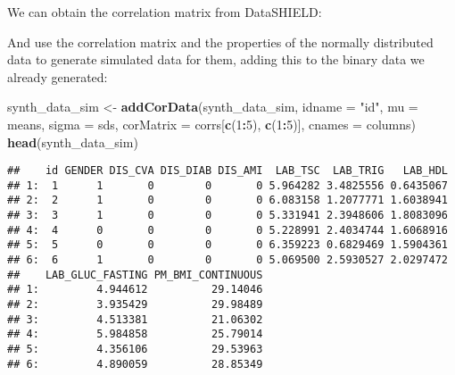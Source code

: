 \documentclass[
]{book}
\newenvironment{Shaded}{\begin{snugshade}}{\end{snugshade}}
\newcommand{\DataTypeTok}[1]{\textcolor[rgb]{0.13,0.29,0.53}{#1}}
\newcommand{\DecValTok}[1]{\textcolor[rgb]{0.00,0.00,0.81}{#1}}
\newcommand{\KeywordTok}[1]{\textcolor[rgb]{0.13,0.29,0.53}{\textbf{#1}}}
\newcommand{\NormalTok}[1]{#1}
\newcommand{\OperatorTok}[1]{\textcolor[rgb]{0.81,0.36,0.00}{\textbf{#1}}}
\newcommand{\StringTok}[1]{\textcolor[rgb]{0.31,0.60,0.02}{#1}}
\begin{document}
We can obtain the correlation matrix from DataSHIELD:

\begin{Shaded}
\end{Shaded}

And use the correlation matrix and the properties of the normally distributed data to generate simulated data for them, adding this to the binary data we already generated:

\begin{Shaded}
\begin{Highlighting}[]
\NormalTok{synth_data_sim <-}\StringTok{ }\KeywordTok{addCorData}\NormalTok{(synth_data_sim, }\DataTypeTok{idname =} \StringTok{"id"}\NormalTok{, }\DataTypeTok{mu =}\NormalTok{ means, }\DataTypeTok{sigma =}\NormalTok{ sds, }\DataTypeTok{corMatrix =}\NormalTok{ corrs[}\KeywordTok{c}\NormalTok{(}\DecValTok{1}\OperatorTok{:}\DecValTok{5}\NormalTok{), }\KeywordTok{c}\NormalTok{(}\DecValTok{1}\OperatorTok{:}\DecValTok{5}\NormalTok{)], }\DataTypeTok{cnames =}\NormalTok{ columns)}
\KeywordTok{head}\NormalTok{(synth_data_sim)}
\end{Highlighting}
\end{Shaded}

\begin{verbatim}
##    id GENDER DIS_CVA DIS_DIAB DIS_AMI  LAB_TSC  LAB_TRIG   LAB_HDL
## 1:  1      1       0        0       0 5.964282 3.4825556 0.6435067
## 2:  2      1       0        0       0 6.083158 1.2077771 1.6038941
## 3:  3      1       0        0       0 5.331941 2.3948606 1.8083096
## 4:  4      0       0        0       0 5.228991 2.4034744 1.6068916
## 5:  5      0       0        0       0 6.359223 0.6829469 1.5904361
## 6:  6      1       0        0       0 5.069500 2.5930527 2.0297472
##    LAB_GLUC_FASTING PM_BMI_CONTINUOUS
## 1:         4.944612          29.14046
## 2:         3.935429          29.98489
## 3:         4.513381          21.06302
## 4:         5.984858          25.79014
## 5:         4.356106          29.53963
## 6:         4.890059          28.85349
\end{verbatim}
\end{document}
